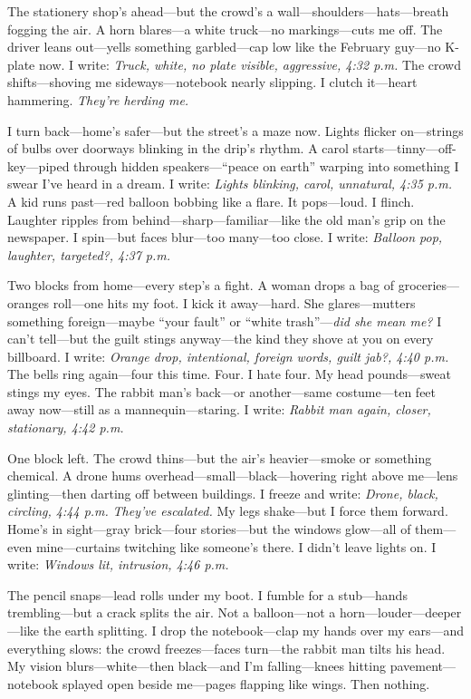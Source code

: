\documentclass{article}
\begin{document}
The stationery shop’s ahead—but the crowd’s a wall—shoulders—hats—breath fogging the air. A horn blares—a white truck—no markings—cuts me off. The driver leans out—yells something garbled—cap low like the February guy—no K-plate now. I write: \textit{Truck, white, no plate visible, aggressive, 4:32 p.m.} The crowd shifts—shoving me sideways—notebook nearly slipping. I clutch it—heart hammering. \textit{They’re herding me.}

I turn back—home’s safer—but the street’s a maze now. Lights flicker on—strings of bulbs over doorways blinking in the drip’s rhythm. A carol starts—tinny—off-key—piped through hidden speakers—“peace on earth” warping into something I swear I’ve heard in a dream. I write: \textit{Lights blinking, carol, unnatural, 4:35 p.m.} A kid runs past—red balloon bobbing like a flare. It pops—loud. I flinch. Laughter ripples from behind—sharp—familiar—like the old man’s grip on the newspaper. I spin—but faces blur—too many—too close. I write: \textit{Balloon pop, laughter, targeted?, 4:37 p.m.}

Two blocks from home—every step’s a fight. A woman drops a bag of groceries—oranges roll—one hits my foot. I kick it away—hard. She glares—mutters something foreign—maybe “your fault” or “white trash”—\textit{did she mean me?} I can’t tell—but the guilt stings anyway—the kind they shove at you on every billboard. I write: \textit{Orange drop, intentional, foreign words, guilt jab?, 4:40 p.m.} The bells ring again—four this time. Four. I hate four. My head pounds—sweat stings my eyes. The rabbit man’s back—or another—same costume—ten feet away now—still as a mannequin—staring. I write: \textit{Rabbit man again, closer, stationary, 4:42 p.m.}

One block left. The crowd thins—but the air’s heavier—smoke or something chemical. A drone hums overhead—small—black—hovering right above me—lens glinting—then darting off between buildings. I freeze and write: \textit{Drone, black, circling, 4:44 p.m.} \textit{They’ve escalated.} My legs shake—but I force them forward. Home’s in sight—gray brick—four stories—but the windows glow—all of them—even mine—curtains twitching like someone’s there. I didn’t leave lights on. I write: \textit{Windows lit, intrusion, 4:46 p.m.}

The pencil snaps—lead rolls under my boot. I fumble for a stub—hands trembling—but a crack splits the air. Not a balloon—not a horn—louder—deeper—like the earth splitting. I drop the notebook—clap my hands over my ears—and everything slows: the crowd freezes—faces turn—the rabbit man tilts his head. My vision blurs—white—then black—and I’m falling—knees hitting pavement—notebook splayed open beside me—pages flapping like wings. Then nothing.
\end{document}
